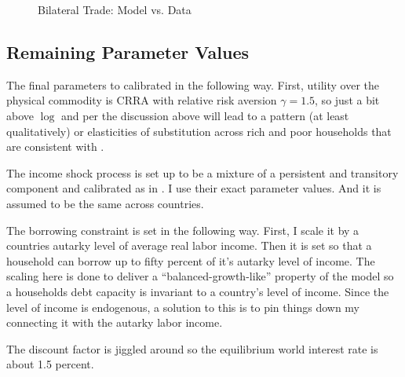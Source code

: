 \documentclass[12pt,pdftex]{article}
\begin{document}
\begin{onehalfspacing}
\begin{figure}[!t]
\caption{Bilateral Trade: Model vs. Data}\label{fig:model-fit}
\end{figure}

\subsection{Remaining Parameter Values}

The final parameters to calibrated in the following way. First, utility over the physical commodity is CRRA with relative risk aversion $\gamma =  1.5$, so just a bit above $\log$ and per the discussion above will lead to a pattern (at least qualitatively) or elasticities of substitution across rich and poor households that are consistent with \citet*{auer2022unequal}.



The income shock process is set up to be a mixture of a persistent and transitory component and calibrated as in \citet*{krueger2016macroeconomics}. I use their exact parameter values. And it is assumed to be the same across countries.

The borrowing constraint is set in the following way. First, I scale it by a countries autarky level of average real labor income. Then it is set so that a household can borrow up to fifty percent of it's autarky level of income. The scaling here is done to deliver a ``balanced-growth-like'' property of the model so a households debt capacity is invariant to a country's level of income. Since the level of income is endogenous, a solution to this is to pin things down my connecting it with the autarky labor income.

The discount factor is jiggled around so the equilibrium world interest rate is about 1.5 percent.


\end{onehalfspacing}
\end{document}
